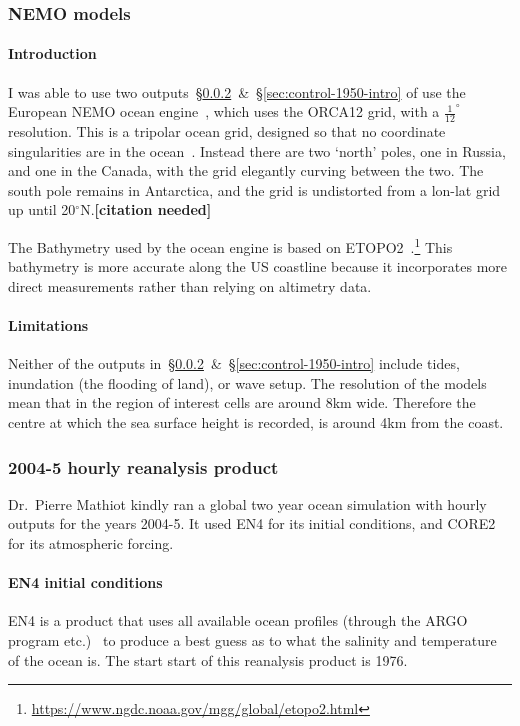 \subsubsection{NEMO models}
\paragraph{Introduction}
\label{sec:nemo}
I was able to use two outputs~§\ref{sec:rean-prod}~\&~§\ref{sec:control-1950-intro}
of use the European NEMO ocean engine~\cite{madec2015nemo}, which uses the ORCA12 grid, with a  $\frac{1}{12}^{\circ}$
resolution.
This is a tripolar ocean grid, designed so that no coordinate singularities are in the ocean~\cite{madec1996global}.
Instead there are two `north' poles, one in Russia, and one in the Canada,
with the grid elegantly curving between the two.
The south pole remains in Antarctica, and the grid is undistorted from a lon-lat
 grid up until 20$^{\circ}$N.\textbf{[citation needed]}

 The Bathymetry used by the ocean engine is based on
 ETOPO2~\cite{lecointre2011definition,noaa20062}.\footnote{\url{https://www.ngdc.noaa.gov/mgg/global/etopo2.html}}
 This bathymetry is more accurate along the US coastline because it incorporates
 more direct measurements rather than relying on altimetry data.

\paragraph{Limitations}

Neither of the outputs in~§\ref{sec:rean-prod}~\&~§\ref{sec:control-1950-intro}
include tides, inundation (the flooding of land), or wave setup.
The resolution of the models mean that in the region of interest cells are around
8km wide. Therefore the centre at which the sea surface height is recorded,
is around 4km from the coast.

\subsubsection{2004-5 hourly reanalysis product}
\label{sec:rean-prod}
Dr.~Pierre Mathiot kindly ran a global two year ocean simulation with
hourly outputs for the years 2004-5. It used EN4 for its initial conditions,
and CORE2 for its atmospheric forcing.

\paragraph{EN4 initial conditions}
EN4 is a product that uses all available ocean profiles
(through the ARGO program etc.)~\cite{good2013en4, HadObs}
to produce a best guess as to what the salinity and temperature of the ocean is.
 The start start of this reanalysis product is 1976.

